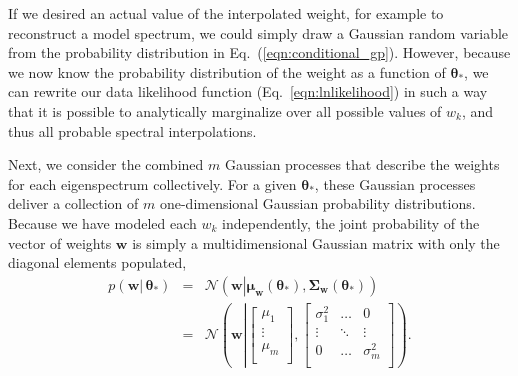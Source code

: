 \documentclass[iop,floatfix,numberedappendix,twocolappendix]{emulateapj}
\newcommand{\vt}{ {\bm \theta}}
\begin{document}
If we desired an actual value of the interpolated weight, for example to reconstruct a model spectrum, we could simply draw a Gaussian random variable from the probability distribution in 
Eq.~(\ref{eqn:conditional_gp}).  However, because we now know the probability distribution of the 
weight as a function of $\vt_\ast$, we can rewrite our data likelihood function 
(Eq.~\ref{eqn:lnlikelihood}) in such a way that it is possible to analytically marginalize over all 
possible values of $w_k$, and thus all probable spectral interpolations. 

Next, we consider the combined $m$ Gaussian processes that describe the weights for each 
eigenspectrum collectively.  For a given $\vt_\ast$, these Gaussian processes deliver a collection 
of $m$ one-dimensional Gaussian probability distributions.  Because we have modeled each $w_k$ 
independently, the joint probability of the vector of weights $\mathbf{w}$ is simply a 
multidimensional Gaussian matrix with only the diagonal elements populated,
\begin{eqnarray} \label{eqn:weight_conditional}
  p(\mathbf{w} |\, \vt_\ast) &=& \mathcal{N} \left ( \mathbf{w} \left | \right .
  \mathbf{\mu}_\mathbf{w}(\vt_\ast), \mathbf{\Sigma}_\mathbf{w}(\vt_\ast) \right ) \\ \nonumber
  & = & \mathcal{N} \left ( \mathbf{w} \left | 
  \begin{bmatrix}
    \mu_1 \\
    \vdots \\
    \mu_m \\
  \end{bmatrix},
  \begin{bmatrix}
    \sigma_1^2 & \ldots & 0 \\
    \vdots & \ddots & \vdots \\
    0 & \ldots & \sigma_m^2 \\
  \end{bmatrix}
  \right .
  \right).
\end{eqnarray}
\end{document}
